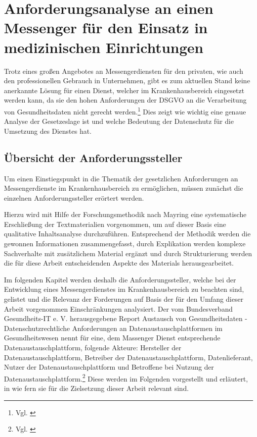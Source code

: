 \chapter{Anforderungsanalyse an einen Messenger für den Einsatz in medizinischen Einrichtungen}\label{chapter:ganforderungen}
Trotz eines großen Angebotes an Messengerdiensten für den privaten, wie auch den professionellen Gebrauch in Unternehmen, gibt es zum aktuellen Stand keine anerkannte Lösung für einen Dienst, welcher im Krankenhausbereich eingesetzt werden kann, da sie den hohen Anforderungen der DSGVO an die Verarbeitung von Gesundheitsdaten nicht gerecht werden.\footnote{Vgl. \cite[S. 1 ff.]{Datenschutzkonferenz2019}} Dies zeigt wie wichtig eine genaue Analyse der Gesetzeslage ist und welche Bedeutung der Datenschutz für die Umsetzung des Dienstes hat.

\section{Übersicht der Anforderungssteller}\label{chapter:hintergrund}
Um einen Einstiegspunkt in die Thematik der gesetzlichen Anforderungen an Messengerdienste im Krankenhausbereich zu ermöglichen, müssen zunächst die einzelnen Anforderungssteller erörtert werden.

Hierzu wird mit Hilfe der Forschungsmethodik nach Mayring eine systematische Erschließung der Textmaterialien vorgenommen, um auf dieser Basis eine qualitative Inhaltsanalyse durchzuführen. Entsprechend der Methodik werden die gewonnen Informationen zusammengefasst, durch Explikation werden komplexe Sachverhalte mit zusätzlichem Material ergänzt und durch Strukturierung werden die für diese Arbeit entscheidenden Aspekte des Materials herausgearbeitet. 

Im folgenden Kapitel werden deshalb die Anforderungssteller, welche bei der Entwicklung eines Messengerdienstes im Krankenhausbereich zu beachten sind, gelistet und die Relevanz der Forderungen auf Basis der für den Umfang dieser Arbeit vorgenommen Einschränkungen analysiert. Der vom Bundesverband Gesundheits-IT e. V. herausgegebene Report \glqq Austausch von Gesundheitsdaten - Datenschutzrechtliche Anforderungen an Datenaustauschplattformen im Gesundheitswesen\grqq{} nennt für eine, dem Massenger Dienst entsprechende Datenaustauschplattform, folgende Akteure: Hersteller der Datenaustauschplattform, Betreiber der Datenaustauschplattform, Datenlieferant, Nutzer der Datenaustauschplattform und Betroffene bei Nutzung der Datenaustauschplattform.\footnote{Vgl. \cite[S. 13]{Bundesverband-Gesundheits-IT-e.V.2016}} Diese werden im Folgenden vorgestellt und erläutert, in wie fern sie für die Zielsetzung dieser Arbeit relevant sind.

